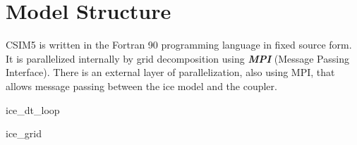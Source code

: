 \documentclass[]{article}
\begin{document}



\section {Model Structure}

CSIM5 is written in the Fortran 90 programming language in fixed source
form.   It is parallelized internally by grid decomposition using
{\bf \textsl{MPI}} (Message Passing Interface).  There is an external layer of
parallelization, also using MPI, that allows message passing between the ice
model and the coupler.

 {ice_dt_loop}



 {ice_grid} 









%
\end{document}
